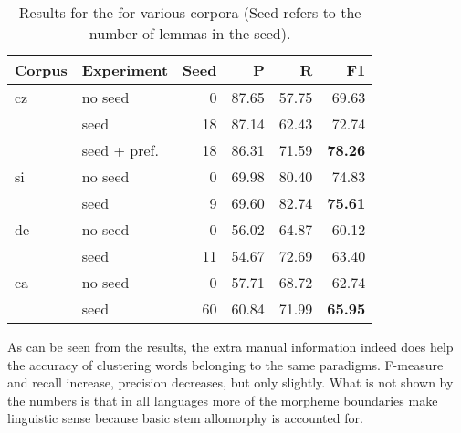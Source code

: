 \documentclass[11pt]{article}
\begin{document}
\begin{table}[h]
\begin{small}
\begin{center}
\begin{tabular}{|@{~}l@{~}|@{~}l@{~}|@{~}r@{~}|@{~}r@{~}|@{~}r@{~}|@{~}r@{~}|}
\hline
\bf Corpus & \bf Experiment & \bf Seed & \bf P & \bf R & \bf F1\\
\hline
cz &no seed      &  0 & 87.65 & 57.75 & 69.63\\
   &seed         & 18 & 87.14 & 62.43 & 72.74\\
   &seed + pref. & 18 & 86.31 & 71.59 & \bf 78.26\bf \\ \hline
si &no seed      &  0 & 69.98 & 80.40 & 74.83\\
   &seed         &  9 & 69.60 & 82.74 & \bf 75.61 \\ \hline
de &no seed      &  0 & 56.02 & 64.87 & 60.12 \\
   &seed         & 11 & 54.67 & 72.69 & 63.40 \\ \hline  %
ca &no seed      &  0 & 57.71 & 68.72 & 62.74\\
   &seed         & 60 & 60.84 & 71.99 & \bf 65.95\\
\hline
\end{tabular}
\end{center}
\end{small}
\caption{\label{table:res} Results for the for various corpora (Seed refers to the number of lemmas in the seed).}
\end{table}


As can be seen from the results, the extra manual information indeed does help the accuracy of clustering words belonging to the same paradigms. F-measure and recall increase, precision decreases, but only slightly.
What is not shown by the numbers is that in all languages more of the morpheme boundaries make linguistic sense because basic stem allomorphy is accounted for.
\end{document}
